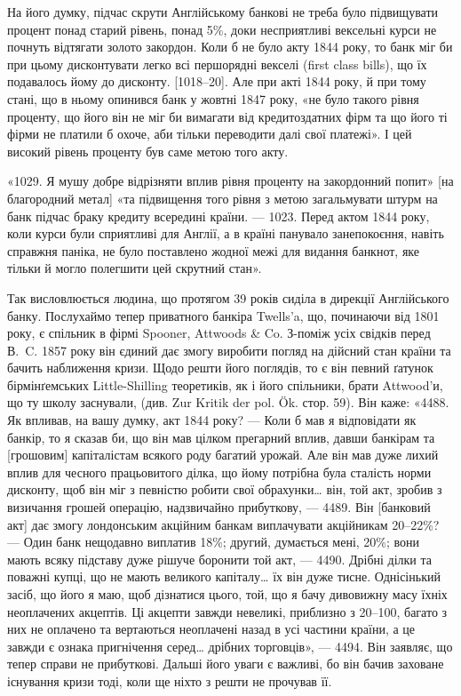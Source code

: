 На його думку, підчас скрути Англійському банкові не треба було підвищувати
процент понад старий рівень, понад 5\%, доки несприятливі вексельні
курси не почнуть відтягати золото закордон. Коли б не було акту 1844 року,
то банк міг би при цьому дисконтувати легко всі першорядні векселі (first class
bills), що їх подавалось йому до дисконту. [1018--20]. Але при акті 1844 року,
й при тому стані, що в ньому опинився банк у жовтні 1847 року, «не було
такого рівня проценту, що його він не міг би вимагати від кредитоздатних фірм
та що його ті фірми не платили б охоче, аби тільки переводити далі свої платежі».
І цей високий рівень проценту був саме метою того акту.

«1029. Я мушу добре відрізняти вплив рівня проценту на закордонний
попит» [на благородний метал] «та підвищення того рівня з метою загальмувати
штурм на банк підчас браку кредиту всередині країни. — 1023. Перед актом
1844 року, коли курси були сприятливі для Англії, а в країні панувало занепокоєння,
навіть справжня паніка, не було поставлено жодної межі для видання
банкнот, яке тільки й могло полегшити цей скрутний стан».

Так висловлюється людина, що протягом 39 років сиділа в дирекції Англійського
банку. Послухаймо тепер приватного банкіра Twells’a, що, починаючи
від 1801 року, є спільник в фірмі Spooner, Attwoods \& Co. З-поміж усіх свідків
перед В.~C. 1857 року він єдиний дає змогу виробити погляд на дійсний стан
країни та бачить наближення кризи. Щодо решти його поглядів, то є він певний
ґатунок бірмінґемських Little-Shilling теоретиків, як і його спільники, брати
Attwood’и, що ту школу заснували, (див. Zur Kritik der pol. Ök. стор. 59). Він
каже: «4488. Як впливав, на вашу думку, акт 1844 року? — Коли б мав я
відповідати як банкір, то я сказав би, що він мав цілком прегарний вплив,
давши банкірам та [грошовим] капіталістам всякого роду багатий урожай. Але
він мав дуже лихий вплив для чесного працьовитого ділка, що йому потрібна
була сталість норми дисконту, щоб він міг з певністю робити свої обрахунки\dots{}
він, той акт, зробив з визичання грошей операцію, надзвичайно прибуткову, —
4489. Він [банковий акт] дає змогу лондонським акційним банкам виплачувати
акційникам 20--22\%? — Один банк нещодавно виплатив 18\%; другий, думається
мені, 20\%; вони мають всяку підставу дуже рішуче боронити той акт, — 4490. Дрібні ділки та поважні
купці, що не мають великого капіталу\dots{} їх він
дуже тисне. Однісінький засіб, що його я маю, щоб дізнатися цього, той, що я
бачу дивовижну масу їхніх неоплачених акцептів. Ці акцепти завжди невеликі,
приблизно з 20--100, багато з них не оплачено та вертаються неоплачені
назад в усі частини країни, а це завжди є ознака пригнічення серед\dots{}
дрібних торговців», — 4494. Він заявляє, що тепер справи не прибуткові. Дальші
його уваги є важливі, бо він бачив заховане існування кризи тоді, коли ще
ніхто з решти не прочував її.

